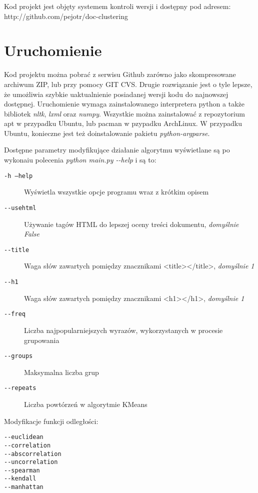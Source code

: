 \documentclass{article}
\begin{document}
Kod projekt jest objęty systemem kontroli wersji i dostępny pod adresem: http://github.com/pejotr/doc-clustering

\section{Uruchomienie}
Kod projektu można pobrać z serwisu Github zarówno jako skompresowane archiwum ZIP, lub przy pomocy GIT CVS. Drugie rozwiązanie jest o tyle lepsze, że umożliwia szybkie uaktualnienie posiadanej wersji kodu do najnowszej dostępnej. Uruchomienie wymaga zainstalowanego interpretera python a także bibliotek \emph{nltk}, \emph{lxml} oraz \emph{numpy}. Wszystkie można zainstalować z repozytorium apt w przypadku Ubuntu, lub pacman w pzypadku ArchLinux. W przypadku Ubuntu, konieczne jest też doinstalowanie pakietu \emph{python-argparse}.

Dostępne parametry modyfikujące działanie algorytmu wyświetlane są po wykonaiu polecenia \emph{python main.py -{}-help} i są to:
\begin{description}
\item [\texttt{-h --help}] Wyświetla wszystkie opcje programu wraz z krótkim opisem
\item [\texttt{-{}-usehtml}] Używanie tagów HTML do lepszej oceny treści dokumentu, \emph{domyślnie False}
\item [\texttt{-{}-title}] Waga słów zawartych pomiędzy znacznikami <title></title>, \emph{domyślnie 1}
\item [\texttt{-{}-h1}] Waga słów zawartych pomiędzy znacznikami <h1></h1>, \emph{domyślnie 1}
\item [\texttt{-{}-freq}] Liczba najpopularniejszych wyrazów, wykorzystanych w procesie grupowania
\item [\texttt{-{}-groups}] Maksymalna liczba grup
\item [\texttt{-{}-repeats}] Liczba powtórzeń w algorytmie KMeans
\end{description}

Modyfikacje funkcji odległości:
\begin{description}
\item [\texttt{-{}-euclidean}] 
\item [\texttt{-{}-correlation}] 
\item [\texttt{-{}-abscorrelation}]
\item [\texttt{-{}-uncorrelation}]
\item [\texttt{-{}-spearman}]
\item [\texttt{-{}-kendall}]
\item [\texttt{-{}-manhattan}]
\end{description}
\end{document}
